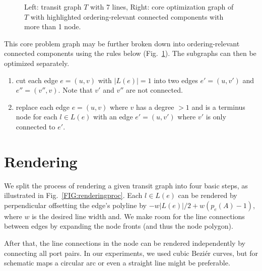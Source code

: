 \documentclass{llncs}
\begin{document}
\begin{figure}
\centering
	
	\hspace{0.6cm}
	
	\caption{Left: transit graph $T$ with 7 lines, Right: core optimization graph of $T$ with highlighted ordering-relevant connected components with more than 1 node.}
	\label{FIG:coreoptimgraph}
\end{figure}
This core problem graph may be further broken down into ordering-relevant connected components using the rules below (Fig.~\ref{FIG:coreoptimgraph}). The subgraphs can then be optimized separately.
\begin{enumerate}
	\item cut each edge $e = (u, v)$ with $\left|L\left(e\right)\right| = 1$ into two edges $e' = (u, v')$ and $e'' = (v'', v)$. Note that $v'$ and $v''$ are not connected.
	\item replace each edge $e = (u, v)$ where $v$ has a degree $>1$ and is a terminus node for each $l \in L(e)$ with an edge $e' = (u, v')$ where $v'$ is only connected to $e'$.
\end{enumerate}

%
\section{Rendering}\label{SEC:rendering}
%
We split the process of rendering a given transit graph into four basic steps, as illustrated in Fig.~\ref{FIG:renderingproc}.
Each $l \in L(e)$ can be rendered by perpendicular offsetting the edge's polyline by $-w\left|L(e)\right|/2 + w\left(p_{e}(A)-1\right)$, where $w$ is the desired line width and. We make room for the line connections between edges by expanding the node fronts (and thus the node polygon).

After that, the line connections in the node can be rendered independently by connecting all port pairs. In our experiments, we used cubic Bezi\'{e}r curves, but for schematic maps a circular arc or even a straight line might be preferable.
\end{document}
